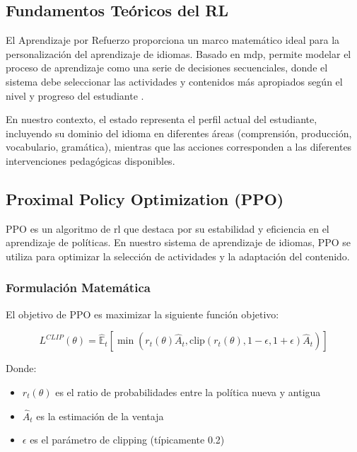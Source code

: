 \subsection{Fundamentos Teóricos del RL}

El Aprendizaje por Refuerzo proporciona un marco matemático ideal para la personalización del aprendizaje de idiomas. Basado en \gls{mdp}, permite modelar el proceso de aprendizaje como una serie de decisiones secuenciales, donde el sistema debe seleccionar las actividades y contenidos más apropiados según el nivel y progreso del estudiante \cite{williams2017educational}.

En nuestro contexto, el estado representa el perfil actual del estudiante, incluyendo su dominio del idioma en diferentes áreas (comprensión, producción, vocabulario, gramática), mientras que las acciones corresponden a las diferentes intervenciones pedagógicas disponibles.

\subsection{Proximal Policy Optimization (PPO)}

PPO \cite{schulman2017proximal} es un algoritmo de \gls{rl} que destaca por su estabilidad y eficiencia en el aprendizaje de políticas. En nuestro sistema de aprendizaje de idiomas, PPO se utiliza para optimizar la selección de actividades y la adaptación del contenido.


\subsubsection{Formulación Matemática}
El objetivo de PPO es maximizar la siguiente función objetivo:

\begin{equation}
  L^{CLIP}(\theta) = \hat{\mathbb{E}}_t[\min(r_t(\theta)\hat{A}_t, \text{clip}(r_t(\theta), 1-\epsilon, 1+\epsilon)\hat{A}_t)]
\end{equation}

Donde:

\begin{itemize}
  \item $r_t(\theta)$ es el ratio de probabilidades entre la política nueva y antigua
  \item $\hat{A}_t$ es la estimación de la ventaja
  \item $\epsilon$ es el parámetro de clipping (típicamente 0.2)
\end{itemize}


